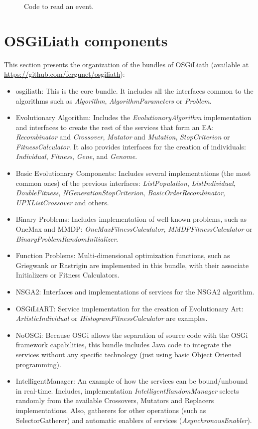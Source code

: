 \begin{figure}
\usebox{\mintedboxOSGIreadevent}
\caption{Code to read an event.}
\label{fig:OSGIreadevent} 
\end{figure}

\section{OSGiLiath components}

This section presents the organization of the bundles of OSGiLiath (available at \url{https://github.com/fergunet/osgiliath}):

\begin{itemize}
\item osgiliath: This is the core bundle. It includes all the interfaces common to the algorithms such as {\em Algorithm}, {\em AlgorithmParameters} or {\em Problem}. 
\item Evolutionary Algorithm:  Includes the {\em EvolutionaryAlgorithm} implementation and interfaces to create the rest of the services that form an EA: {\em Recombinator} and {\em Crossover}, {\em Mutator} and {\em Mutation}, {\em StopCriterion} or {\em FitnessCalculator}. It also provides interfaces for the creation of individuals: {\em Individual}, {\em Fitness}, {\em Gene}, and {\em Genome}. 
\item Basic Evolutionary Components: Includes several implementations (the most common ones) of the previous interfaces: {\em ListPopulation}, {\em ListIndividual}, {\em DoubleFitness}, {\em NGe\-ne\-ra\-tion\-Stop\-Cri\-te\-rion}, {\em BasicOrderRecombinator}, {\em UPXListCrossover} and others.
\item Binary Problems: Includes implementation of well-known problems, such as OneMax and MMDP: {\em OneMaxFitnessCalculator}, {\em MMDPFitnessCalculator} or {\em BinaryProblemRandomInitializer}.
\item Function Problems: Multi-dimensional optimization functions, such as Griegwank or Rastrigin are implemented in this bundle, with their associate Initializers or Fitness Calculators.
\item NSGA2: Interfaces and implementations of services for the NSGA2 algorithm.
\item OSGiLiART: Service implementation for the creation of Evolutionary Art: {\em ArtisticIndividual} or {\em HistogramFitnessCalculator} are examples.
\item NoOSGi: Because OSGi allows the separation of source code with the OSGi framework capabilities, this bundle includes Java code to integrate the services without any specific technology (just using basic Object Oriented programming).
\item IntelligentManager: An example of how the services can be bound/unbound in real-time. Includes, implementation {\em IntelligentRandomManager} selects randomly from the available Crossovers, Mutators and Replacers implementations. Also, gatherers for other operations (such as SelectorGatherer) and automatic enablers of services ({\em AsynchronousEnabler}).
\end{itemize}